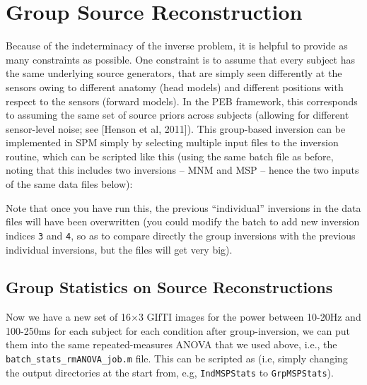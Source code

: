 \section{Group Source Reconstruction}

Because of the indeterminacy of the inverse problem, it is helpful to provide as many constraints as possible. One constraint is to assume that every subject has the same underlying source generators, that are simply seen differently at the sensors owing to different anatomy (head models) and different positions with respect to the sensors (forward models). In the PEB framework, this corresponds to assuming the same set of source priors across subjects (allowing for different sensor-level noise; see [Henson et al, 2011]). This group-based inversion can be implemented in SPM simply by selecting multiple input files to the inversion routine, which can be scripted like this (using the same batch file as before, noting that this includes two inversions -- MNM and MSP -- hence the two inputs of the same data files below):


Note that once you have run this, the previous ``individual'' inversions in the data files will have been overwritten (you could modify the batch to add new inversion indices \texttt{3} and \texttt{4}, so as to compare directly the group inversions with the previous individual inversions, but the files will get very big).

\subsection{Group Statistics on Source Reconstructions}

Now we have a new set of 16\(\times\)3 GIfTI images for the power between 10-20Hz and 100-250ms for each subject for each condition after group-inversion, we can put them into the same repeated-measures ANOVA that we used above, i.e., the \texttt{batch\_stats\_rmANOVA\_job.m} file. This can be scripted as (i.e, simply changing the output directories at the start from, e.g, \texttt{IndMSPStats} to \texttt{GrpMSPStats}).

